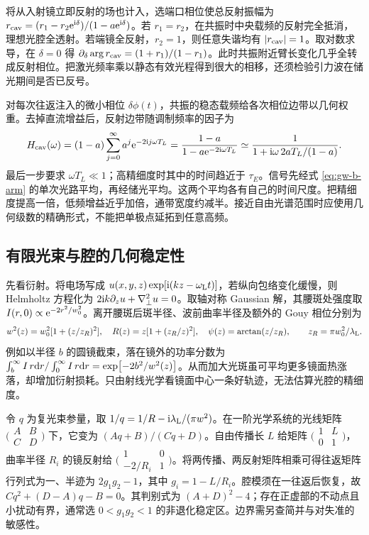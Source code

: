 将从入射镜立即反射的场也计入，选端口相位使总反射振幅为 $r_{\rm cav}=(r_1-r_2\mathrm{e}^{\mathrm{i}\delta})/(1-a\mathrm{e}^{\mathrm{i}\delta})$。若 $r_1=r_2$，在共振时中央载频的反射完全抵消，理想光腔全透射。若端镜全反射，$r_2=1$，则任意失谐均有 $|r_{\rm cav}|=1$。取对数求导，在 $\delta=0$ 得 $\partial_\delta\arg r_{\rm cav}=(1+r_1)/(1-r_1)$。此时共振附近臂长变化几乎全转成反射相位。把激光频率乘以静态有效光程得到很大的相移，还须检验引力波在储光期间是否已反号。

对每次往返注入的微小相位 $\delta\phi(t)$，共振的稳态载频给各次相位边带以几何权重。去掉直流增益后，反射边带随调制频率的因子为
\[
 H_{\rm cav}(\omega)=(1-a)\sum_{j=0}^\infty a^j\mathrm{e}^{-2\mathrm{i} j\omega T_L}
 =\frac{1-a}{1-a\mathrm{e}^{-2\mathrm{i}\omega T_L}}
 \simeq\frac{1}{1+\mathrm{i}\omega\,2aT_L/(1-a)} .
\]
最后一步要求 $\omega T_L\ll1$；高精细度时其中的时间趋近于 $\tau_E$。信号先经式 \eqref{eq:gw-b-arm} 的单次光路平均，再经储光平均。这两个平均各有自己的时间尺度。把精细度提高一倍，低频增益近乎加倍，通带宽度约减半。接近自由光谱范围时应使用几何级数的精确形式，不能把单极点延拓到任意高频。

\subsection{有限光束与腔的几何稳定性}
先看衍射。将电场写成 $u(x,y,z)\exp[\mathrm{i}(kz-\omega_{\rm L}t)]$，若纵向包络变化缓慢，则 Helmholtz 方程化为 $2\mathrm{i} k\partial_z u+\nabla_\perp^2u=0$。取轴对称 Gaussian 解，其腰斑处强度取 $I(r,0)\propto\mathrm{e}^{-2r^2/w_0^2}$。离开腰斑后斑半径、波前曲率半径及额外的 Gouy 相位分别为
\[
 w^2(z)=w_0^2[1+(z/z_R)^2],\quad
 R(z)=z[1+(z_R/z)^2],\quad
 \psi(z)=\arctan(z/z_R),\qquad z_R=\pi w_0^2/\lambda_{\rm L}.
\]
例如以半径 $b$ 的圆镜截束，落在镜外的功率分数为 $\int_b^\infty I\,r\dd r/\int_0^\infty I\,r\dd r=\exp[-2b^2/w^2(z)]$。从而加大光斑虽可平均更多镜面热涨落，却增加衍射损耗。只由射线光学看镜面中心一条好轨迹，无法估算光腔的精细度。

令 $q$ 为复光束参量，取 $1/q=1/R-\mathrm{i}\lambda_{\rm L}/(\pi w^2)$。在一阶光学系统的光线矩阵 $\bigl(\begin{smallmatrix}A&B\\C&D\end{smallmatrix}\bigr)$ 下，它变为 $(Aq+B)/(Cq+D)$。自由传播长 $L$ 给矩阵 $\bigl(\begin{smallmatrix}1&L\\0&1\end{smallmatrix}\bigr)$，曲率半径 $R_i$ 的镜反射给 $\bigl(\begin{smallmatrix}1&0\\-2/R_i&1\end{smallmatrix}\bigr)$。将两传播、两反射矩阵相乘可得往返矩阵行列式为一、半迹为 $2g_1g_2-1$，其中 $g_i=1-L/R_i$。腔模须在一往返后恢复，故 $Cq^2+(D-A)q-B=0$。其判别式为 $(A+D)^2-4$；存在正虚部的不动点且小扰动有界，通常选 $0<g_1g_2<1$ 的非退化稳定区。边界需另查简并与对失准的敏感性。

